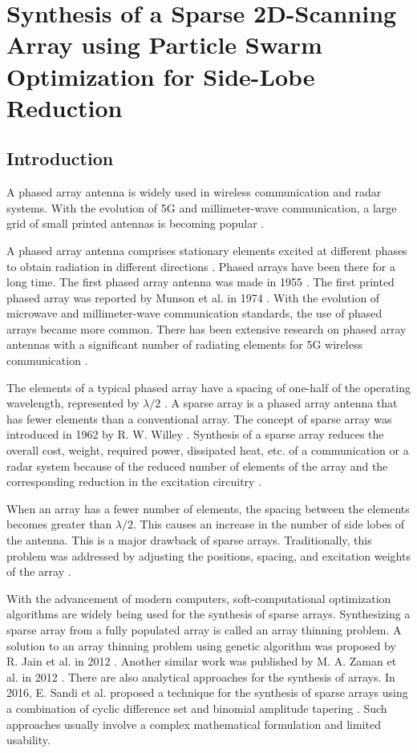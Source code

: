 \chapter{Synthesis of a Sparse 2D-Scanning Array using Particle Swarm Optimization for Side-Lobe Reduction}
\label{chap:chap5}
\section{Introduction}\label{c5sec_intro}
A phased array antenna is widely used in wireless communication and radar systems. With the evolution of 5G and millimeter-wave communication, a large grid of small printed antennas is becoming popular \cite{5gmmwave, 5gmmwave_fr4}.

A phased array antenna comprises stationary elements excited at different phases to obtain radiation in different directions \cite{phasedArrayHandbook}. Phased arrays have been there for a long time. The first phased array antenna was made in 1955 \cite{phasedArray_russia}. The first printed phased array was reported by Munson et al. in 1974 \cite{txmPhasedArray}. With the evolution of microwave and millimeter-wave communication standards, the use of phased arrays became more common. There has been extensive research on phased array antennas with a significant number of radiating elements for 5G wireless communication \cite{mmarrayRrev}.

The elements of a typical phased array have a spacing of one-half of the operating wavelength, represented by $\lambda/2$ \cite{phasedArrayHandbook}. A sparse array is a phased array antenna that has fewer elements than a conventional array. The concept of sparse array was introduced in 1962 by R. W. Willey \cite{sparse_rect_planar}. Synthesis of a sparse array reduces the overall cost, weight, required power, dissipated heat, etc. of a communication or a radar system because of the reduced number of elements of the array and the corresponding reduction in the excitation circuitry \cite{sparseDesignConstraints}.

When an array has a fewer number of elements, the spacing between the elements becomes greater than $\lambda/2$. This causes an increase in the number of side lobes of the antenna. This is a major drawback of sparse arrays. Traditionally, this problem was addressed by adjusting the positions, spacing, and excitation weights of the array \cite{sparseDesignConstraints}.

With the advancement of modern computers, soft-computational optimization algorithms are widely being used for the synthesis of sparse arrays. Synthesizing a sparse array from a fully populated array is called an array thinning problem. A solution to an array thinning problem using genetic algorithm was proposed by R. Jain et al. in 2012 \cite{thinningGA}. Another similar work was published by M. A. Zaman et al. in 2012 \cite{nunUniformLinear}. There are also analytical approaches for the synthesis of arrays. In 2016, E. Sandi et al. proposed a technique for the synthesis of sparse arrays using a combination of cyclic difference set and binomial amplitude tapering \cite{amplitudeTaperingHybrid}. Such approaches usually involve a complex mathematical formulation and limited usability.

